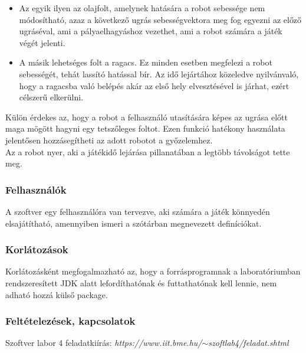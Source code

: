 \begin{itemize}
	\item Az egyik ilyen az olajfolt, amelynek hatására a robot sebessége nem módosítható, azaz a következő ugrás sebességvektora meg fog egyezni az előző ugráséval, ami a pályaelhagyáshoz vezethet, ami a robot számára a játék végét jelenti.
	\item A másik lehetséges folt a ragacs. Ez minden esetben megfelezi a robot sebességét, tehát lassító hatással bír. Az idő lejártához közeledve nyilvánvaló, hogy a ragacsba való belépés akár az első hely elvesztésével is járhat, ezért célszerű elkerülni.
\end{itemize}

Külön érdekes az, hogy a robot a felhasználó utasítására képes az ugrása előtt maga mögött hagyni egy tetszőleges foltot. Ezen funkció hatékony használata jelentősen hozzásegítheti az adott robotot a győzelemhez. \\

Az a robot nyer, aki a játékidő lejárása pillanatában a legtöbb távolságot tette meg.
 

\subsubsection{Felhasználók}

A szoftver egy felhasználóra van tervezve, aki számára a játék könnyedén elsajátítható, amennyiben ismeri a szótárban megnevezett definíciókat.

\subsubsection{Korlátozások}

Korlátozásként megfogalmazható az, hogy a forrásprogramnak a laboratóriumban rendszeresített JDK alatt lefordíthatónak és futtathatónak kell lennie, nem adható hozzá külső package.

\subsubsection{Feltételezések, kapcsolatok}

Szoftver labor 4 feladatkiírás: \textit{https://www.iit.bme.hu/$\sim$szoftlab4/feladat.shtml}


